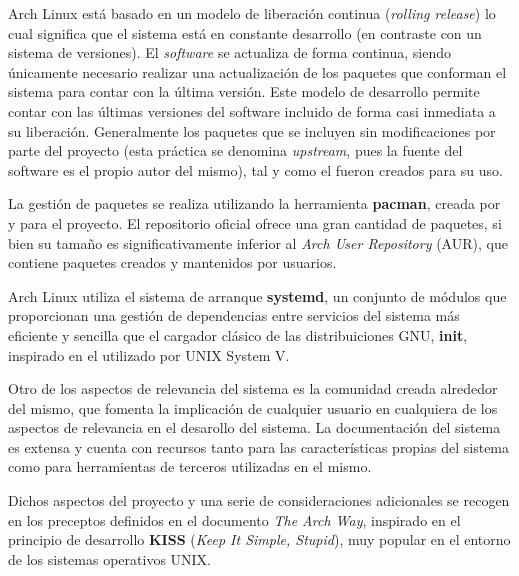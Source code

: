 Arch Linux está basado en un modelo de liberación continua (\textit{rolling release}) lo cual significa que el sistema está en constante desarrollo (en contraste con un sistema de versiones). El \textit{software} se actualiza de forma continua, siendo únicamente necesario realizar una actualización de los paquetes que conforman el sistema para contar con la última versión. Este modelo de desarrollo permite contar con las últimas versiones del software incluido de forma casi inmediata a su liberación. Generalmente los paquetes que se incluyen sin modificaciones por parte del proyecto (esta práctica se denomina \textit{upstream}, pues la fuente del software es el propio autor del mismo), tal y como el fueron creados para su uso.

La gestión de paquetes se realiza utilizando la herramienta \textbf{pacman}\cite{pacman}, creada por y para el proyecto. El repositorio oficial ofrece una gran cantidad de paquetes, si bien su tamaño es significativamente inferior al \textit{Arch User Repository} (AUR), que contiene paquetes creados y mantenidos por usuarios.

Arch Linux utiliza el sistema de arranque \textbf{systemd}\cite{systemd}, un conjunto de módulos que proporcionan una gestión de dependencias entre servicios del sistema más eficiente y sencilla que el cargador clásico de las distribuiciones GNU, \textbf{init}\cite{init}, inspirado en el utilizado por UNIX System V.

Otro de los aspectos de relevancia del sistema es la comunidad creada alrededor del mismo, que fomenta la implicación de cualquier usuario en cualquiera de los aspectos de relevancia en el desarollo del sistema. La documentación del sistema es extensa y cuenta con recursos tanto para las características propias del sistema como para herramientas de terceros utilizadas en el mismo. %

Dichos aspectos del proyecto y una serie de consideraciones adicionales se recogen en los preceptos definidos en el documento \textit{The Arch Way}\cite{thearchway}, inspirado en el principio de desarrollo \textbf{KISS} (\textit{Keep It Simple, Stupid}), muy popular en el entorno de los sistemas operativos UNIX.%

